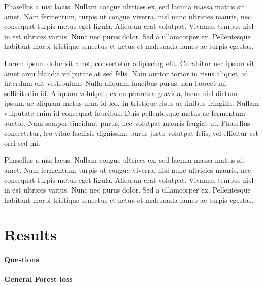 \documentclass[
  letterpaper,
  DIV=11,
  numbers=noendperiod]{scrreprt}
\begin{document}
Phasellus a nisi lacus. Nullam congue ultrices ex, sed lacinia massa
mattis sit amet. Nam fermentum, turpis ut congue viverra, nisl nunc
ultricies mauris, nec consequat turpis metus eget ligula. Aliquam erat
volutpat. Vivamus tempus nisl in est ultrices varius. Nunc nec purus
dolor. Sed a ullamcorper ex. Pellentesque habitant morbi tristique
senectus et netus et malesuada fames ac turpis egestas.

Lorem ipsum dolor sit amet, consectetur adipiscing elit. Curabitur nec
ipsum sit amet arcu blandit vulputate at sed felis. Nam auctor tortor in
risus aliquet, id interdum elit vestibulum. Nulla aliquam faucibus
purus, non laoreet mi sollicitudin id. Aliquam volutpat, ex eu pharetra
gravida, lacus nisl dictum ipsum, ac aliquam metus urna id leo. In
tristique risus ac finibus fringilla. Nullam vulputate enim id consequat
faucibus. Duis pellentesque metus ac fermentum auctor. Nam semper
tincidunt purus, nec volutpat mauris feugiat ut. Phasellus consectetur,
leo vitae facilisis dignissim, purus justo volutpat felis, vel efficitur
est orci sed mi.

Phasellus a nisi lacus. Nullam congue ultrices ex, sed lacinia massa
mattis sit amet. Nam fermentum, turpis ut congue viverra, nisl nunc
ultricies mauris, nec consequat turpis metus eget ligula. Aliquam erat
volutpat. Vivamus tempus nisl in est ultrices varius. Nunc nec purus
dolor. Sed a ullamcorper ex. Pellentesque habitant morbi tristique
senectus et netus et malesuada fames ac turpis egestas.


\hypertarget{results}{%
\chapter{Results}\label{results}}

\hypertarget{questions}{%
\subsubsection{Questions}\label{questions}}

\hypertarget{general-forest-loss}{%
\subsubsection{General Forest loss}\label{general-forest-loss}}
\end{document}
